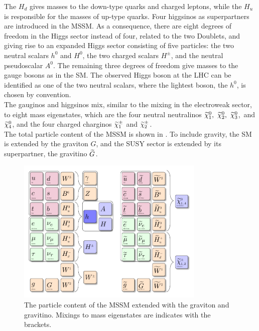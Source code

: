 The $H_d$ gives masses to the down-type quarks and charged leptons, while the $H_u$ is responsible for the masses of up-type quarks. Four higgsinos as superpartners are introduced in the MSSM. As a consequence, there are eight degrees of freedom in the Higgs sector instead of four, related to the two Doublets, and giving rise to an expanded Higgs sector consisting of five particles: the two neutral scalars $h^0$ and $H^0$, the two charged scalars $H^{\pm}$, and the neutral pseudoscalar $A^0$. The remaining three degrees of freedom give masses to the gauge bosons as in the SM. The observed Higgs boson at the LHC can be identified as one of the two neutral scalars, where the lightest boson, the $h^0$, is chosen by convention.\\
The gauginos and higgsinos mix, similar to the mixing in the electroweak sector, to eight mass eigenstates, which are the four neutral neutralinos $\widetilde{\chi}^{0}_{1},~\widetilde{\chi}^{0}_{2},~\widetilde{\chi}^{0}_{3}$,~and $\widetilde{\chi}^{0}_{4}$, and the four charged charginos $\widetilde{\chi}^\pm_{1}$ and $\widetilde{\chi}^{\pm}_{2}$.\\
The total particle content of the MSSM is shown in . To include gravity, the SM is extended by the graviton $G$, and the SUSY sector is extended by its superpartner, the gravitino $\widetilde{G}$.

\begin{figure}[tbp]
 \centering
 \includegraphics[width=0.8\textwidth]{figures/general/MSSM}
 \caption{The particle content of the MSSM extended with the graviton and gravitino. Mixings to mass eigenstates are indicates with the brackets.}
 \label{fig:mssm}
\end{figure}

